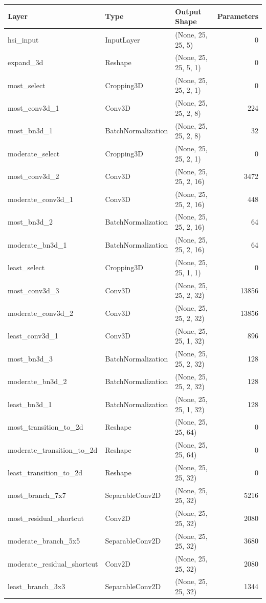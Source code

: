 \begin{tabular}{lllr}
\toprule
Layer & Type & Output Shape & Parameters \\
\midrule
hsi_input & InputLayer & (None, 25, 25, 5) & 0 \\
expand_3d & Reshape & (None, 25, 25, 5, 1) & 0 \\
most_select & Cropping3D & (None, 25, 25, 2, 1) & 0 \\
most_conv3d_1 & Conv3D & (None, 25, 25, 2, 8) & 224 \\
most_bn3d_1 & BatchNormalization & (None, 25, 25, 2, 8) & 32 \\
moderate_select & Cropping3D & (None, 25, 25, 2, 1) & 0 \\
most_conv3d_2 & Conv3D & (None, 25, 25, 2, 16) & 3472 \\
moderate_conv3d_1 & Conv3D & (None, 25, 25, 2, 16) & 448 \\
most_bn3d_2 & BatchNormalization & (None, 25, 25, 2, 16) & 64 \\
moderate_bn3d_1 & BatchNormalization & (None, 25, 25, 2, 16) & 64 \\
least_select & Cropping3D & (None, 25, 25, 1, 1) & 0 \\
most_conv3d_3 & Conv3D & (None, 25, 25, 2, 32) & 13856 \\
moderate_conv3d_2 & Conv3D & (None, 25, 25, 2, 32) & 13856 \\
least_conv3d_1 & Conv3D & (None, 25, 25, 1, 32) & 896 \\
most_bn3d_3 & BatchNormalization & (None, 25, 25, 2, 32) & 128 \\
moderate_bn3d_2 & BatchNormalization & (None, 25, 25, 2, 32) & 128 \\
least_bn3d_1 & BatchNormalization & (None, 25, 25, 1, 32) & 128 \\
most_transition_to_2d & Reshape & (None, 25, 25, 64) & 0 \\
moderate_transition_to_2d & Reshape & (None, 25, 25, 64) & 0 \\
least_transition_to_2d & Reshape & (None, 25, 25, 32) & 0 \\
most_branch_7x7 & SeparableConv2D & (None, 25, 25, 32) & 5216 \\
most_residual_shortcut & Conv2D & (None, 25, 25, 32) & 2080 \\
moderate_branch_5x5 & SeparableConv2D & (None, 25, 25, 32) & 3680 \\
moderate_residual_shortcut & Conv2D & (None, 25, 25, 32) & 2080 \\
least_branch_3x3 & SeparableConv2D & (None, 25, 25, 32) & 1344 \\

\end{tabular}
